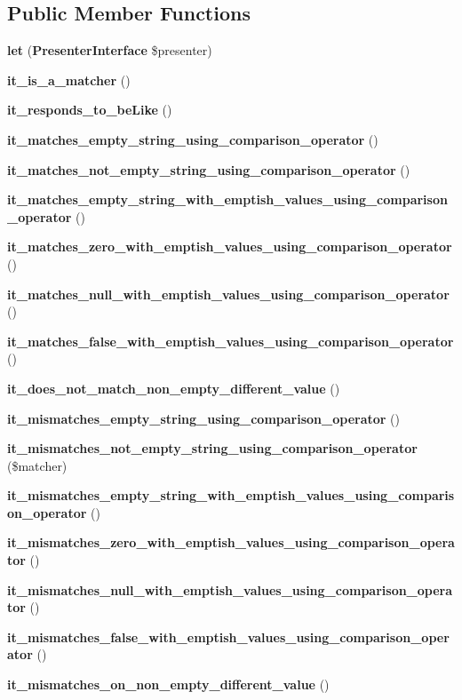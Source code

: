 \subsection*{Public Member Functions}
\begin{DoxyCompactItemize}
\item 
{\bf let} ({\bf Presenter\+Interface} \$presenter)
\item 
{\bf it\+\_\+is\+\_\+a\+\_\+matcher} ()
\item 
{\bf it\+\_\+responds\+\_\+to\+\_\+be\+Like} ()
\item 
{\bf it\+\_\+matches\+\_\+empty\+\_\+string\+\_\+using\+\_\+comparison\+\_\+operator} ()
\item 
{\bf it\+\_\+matches\+\_\+not\+\_\+empty\+\_\+string\+\_\+using\+\_\+comparison\+\_\+operator} ()
\item 
{\bf it\+\_\+matches\+\_\+empty\+\_\+string\+\_\+with\+\_\+emptish\+\_\+values\+\_\+using\+\_\+comparison\+\_\+operator} ()
\item 
{\bf it\+\_\+matches\+\_\+zero\+\_\+with\+\_\+emptish\+\_\+values\+\_\+using\+\_\+comparison\+\_\+operator} ()
\item 
{\bf it\+\_\+matches\+\_\+null\+\_\+with\+\_\+emptish\+\_\+values\+\_\+using\+\_\+comparison\+\_\+operator} ()
\item 
{\bf it\+\_\+matches\+\_\+false\+\_\+with\+\_\+emptish\+\_\+values\+\_\+using\+\_\+comparison\+\_\+operator} ()
\item 
{\bf it\+\_\+does\+\_\+not\+\_\+match\+\_\+non\+\_\+empty\+\_\+different\+\_\+value} ()
\item 
{\bf it\+\_\+mismatches\+\_\+empty\+\_\+string\+\_\+using\+\_\+comparison\+\_\+operator} ()
\item 
{\bf it\+\_\+mismatches\+\_\+not\+\_\+empty\+\_\+string\+\_\+using\+\_\+comparison\+\_\+operator} (\$matcher)
\item 
{\bf it\+\_\+mismatches\+\_\+empty\+\_\+string\+\_\+with\+\_\+emptish\+\_\+values\+\_\+using\+\_\+comparison\+\_\+operator} ()
\item 
{\bf it\+\_\+mismatches\+\_\+zero\+\_\+with\+\_\+emptish\+\_\+values\+\_\+using\+\_\+comparison\+\_\+operator} ()
\item 
{\bf it\+\_\+mismatches\+\_\+null\+\_\+with\+\_\+emptish\+\_\+values\+\_\+using\+\_\+comparison\+\_\+operator} ()
\item 
{\bf it\+\_\+mismatches\+\_\+false\+\_\+with\+\_\+emptish\+\_\+values\+\_\+using\+\_\+comparison\+\_\+operator} ()
\item 
{\bf it\+\_\+mismatches\+\_\+on\+\_\+non\+\_\+empty\+\_\+different\+\_\+value} ()
\end{DoxyCompactItemize}
